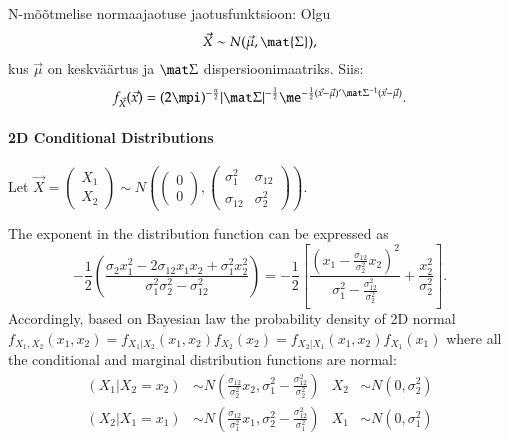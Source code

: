 \documentclass[a4paper]{article}
\numberwithin{equation}{subsection}
\begin{document}
N-mõõtmelise normaajaotuse jaotusfunktsioon: Olgu
\begin{equation}
  \vec{X} \sim N(\vec{\mu}, \mat{\Sigma}),
\end{equation}
kus $\vec\mu$ on keskväärtus ja $\mat\Sigma$ dispersioonimaatriks.
Siis:
\begin{equation}
f_{\vec{X}} (\vec x) = 
  (2\mpi)^{-\frac{n}{2}} 
  |\mat\Sigma|^{-\frac{1}{2}}
  \me^{-\frac{1}{2}(\vec x - \vec\mu)' \mat\Sigma^{-1} (\vec x -
    \vec\mu)}.
\label{eq:N-Dimensional_normal}
\end{equation}

\paragraph{2D Conditional Distributions}
Let
\begin{math}
  \vec{X}=
  \begin{pmatrix}
    X_1\\
    X_2
  \end{pmatrix}
  \sim
  N \left( 
    \begin{pmatrix}
      0\\0
    \end{pmatrix},
    \begin{pmatrix}
      \sigma_1^2 & \sigma_{12} \\ 
      \sigma_{12} & \sigma_2^2
    \end{pmatrix}
\right)
\end{math}.

The exponent in the distribution function can be expressed as
\begin{equation}
  -\frac{1}{2} \left(
    \frac{
      \sigma_{2}x_{1}^{2} - 2 \sigma_{12} x_{1} x_{2} +
      \sigma_{1}^{2} x_{2}^{2}}
    {\sigma_{1}^{2} \sigma_{2}^{2} - \sigma_{12}^{2}}
  \right)
  =
  -\frac{1}{2} \left[
    \frac{\left(
        x_{1} - 
        \displaystyle\frac{\sigma_{12}}{\sigma_{2}^{2}}x_{2}
      \right)^{2}}
    {\sigma_{1}^{2} - \displaystyle\frac{\sigma_{12}^{2}}{\sigma_{2}^{2}}}
    +
    \frac{x_{2}^{2}}{\sigma_{2}^{2}}
  \right].
  \label{eq:normal2D_exponent}
\end{equation}
Accordingly, based on Bayesian law the probability density of 2D normal
\begin{math}
f_{X_{1},X_{2}}(x_{1},x_{2}) = 
f_{X_{1}|X_{2}}(x_{1},x_{2}) f_{X_{2}}(x_{2}) =
f_{X_{2}|X_{1}}(x_{1},x_{2}) f_{X_{1}}(x_{1})
\end{math}
where all the conditional and marginal distribution functions are
normal:
\begin{align}
  (X_{1}|X_{2} = x_{2}) 
  &\sim
  N \left(
    \frac{\sigma_{12}}{\sigma_{2}^{2}} x_{2},
    \sigma_{1}^{2} - \frac{\sigma_{12}^{2}}{\sigma_{2}^{2}}
  \right)
  &
  X_{2} &\sim N(0, \sigma_{2}^{2})
  \\
  (X_{2}|X_{1} = x_{1}) 
  &\sim
  N \left(
    \frac{\sigma_{12}}{\sigma_{1}^{2}} x_{1},
    \sigma_{2}^{2} - \frac{\sigma_{12}^{2}}{\sigma_{1}^{2}}
  \right)
  &
  X_{1} &\sim N(0, \sigma_{1}^{2})
\end{align}
\end{document}
